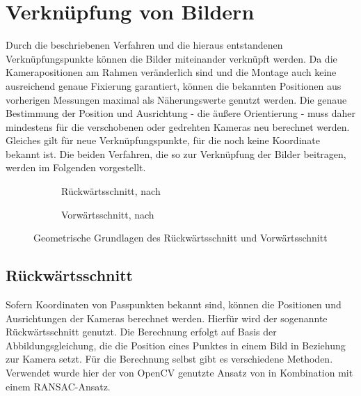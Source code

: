 \documentclass[./00PhotoBox.tex]{subfiles}
\begin{document}
\section{Verknüpfung von Bildern}
\label{s:photogramm}
Durch die beschriebenen Verfahren und die hieraus entstandenen Verknüpfungs\-punkte können die Bilder miteinander verknüpft werden. Da die Kamerapositionen am Rahmen veränderlich sind und die Montage auch keine ausreichend genaue Fixierung garantiert, können die bekannten Positionen aus vorherigen Messungen maximal als Näherungswerte genutzt werden. Die genaue Bestimmung der Position und Ausrichtung - die äußere Orientierung - muss daher mindestens für die verschobenen oder gedrehten Kameras neu berechnet werden. Gleiches gilt für neue Verknüpfungspunkte, für die noch keine Koordinate bekannt ist. Die beiden Verfahren, die so zur Verknüpfung der Bilder beitragen, werden im Folgenden vorgestellt.


\begin{figure}
    \centering
    \begin{subfigure}{0.45\textwidth}
        
        \centering
        \caption{Rückwärtsschnitt, nach \citealt[S. 284]{luhmann}} %
        \label{img:rueckwaertsschnitt} %
    \end{subfigure}
    \begin{subfigure}{0.45\textwidth}
        
        \centering
        \caption{Vorwärtsschnitt, nach \citealt[S. 339]{luhmann}} %
        \label{img:vorwaertsschnitt} %
    \end{subfigure}
    \caption{Geometrische Grundlagen des Rückwärtsschnitt und Vorwärtsschnitt} %
\end{figure}


\subsection{Rückwärtsschnitt}
Sofern Koordinaten von Passpunkten bekannt sind, können die Positionen und Ausrichtungen der Kameras berechnet werden. Hierfür wird der sogenannte Rückwärtsschnitt genutzt. Die Berechnung erfolgt auf Basis der Abbildungsgleichung, die die Position eines Punktes in einem Bild in Beziehung zur Kamera setzt. Für die Berechnung selbst gibt es verschiedene Methoden. Verwendet wurde hier der von OpenCV genutzte Ansatz von \cite{Lepetit2008} in Kombination mit einem RANSAC-Ansatz.
\end{document}
